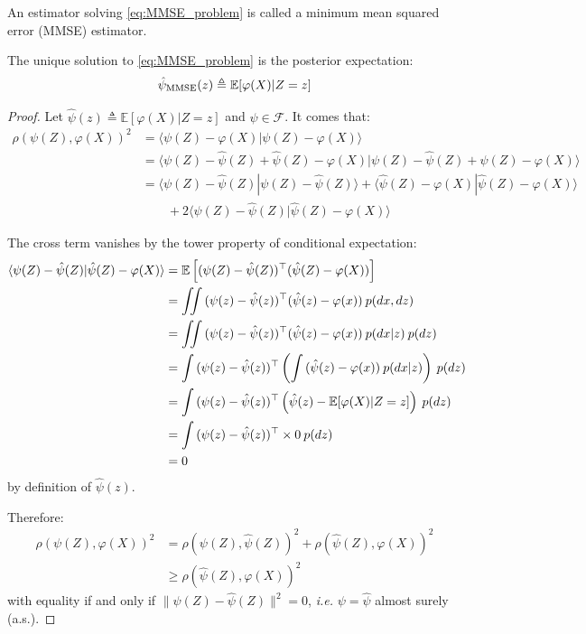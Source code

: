 An estimator solving \eqref{eq:MMSE_problem} is called a minimum mean squared error (MMSE) estimator.

\begin{proposition}\label{th:MMSE_estimator}
	The unique solution to \eqref{eq:MMSE_problem} is the posterior expectation:
	\begin{equation}
		\hat{\psi}_{\textup{MMSE}}(z)\triangleq\mathbb{E}[\varphi(X)|Z=z]
	\end{equation}
\end{proposition}

\begin{proof}
	Let $\hat{\psi}(z)\triangleq\mathbb{E}[\varphi(X)|Z=z]$ and $\psi\in\mathcal{F}$. It comes that:
	\begin{equation}
		\begin{aligned}
		\rho(\psi(Z),\varphi(X))^2&=\langle\psi(Z)-\varphi(X)|\psi(Z)-\varphi(X)\rangle\\
		&=\langle\psi(Z)-\hat{\psi}(Z)+\hat{\psi}(Z)-\varphi(X)|\psi(Z)-\hat{\psi}(Z)+\hat{\psi}(Z)-\varphi(X)\rangle\\
		&=\langle\psi(Z)-\hat{\psi}(Z)|\psi(Z)-\hat{\psi}(Z)\rangle+\langle\hat{\psi}(Z)-\varphi(X)|\hat{\psi}(Z)-\varphi(X)\rangle\\
		&\qquad+2\langle\psi(Z)-\hat{\psi}(Z)|\hat{\psi}(Z)-\varphi(X)\rangle
		\end{aligned}
	\end{equation}

	The cross term vanishes by the tower property of conditional expectation:
	\begin{equation}
		\begin{aligned}
		\langle\psi(Z)-\hat{\psi}(Z)|\hat{\psi}(Z)-\varphi(X)\rangle&=\mathbb{E}\left[(\psi(Z)-\hat{\psi}(Z))^\top(\hat{\psi}(Z)-\varphi(X))\right]\\
		&=\iint{(\psi(z)-\hat{\psi}(z))^\top(\hat{\psi}(z)-\varphi(x))\:p(dx,dz)}\\
		&=\iint{(\psi(z)-\hat{\psi}(z))^\top(\hat{\psi}(z)-\varphi(x))\:p(dx|z)\:p(dz)}\\
		&=\int{(\psi(z)-\hat\psi(z))^\top\left(\int{(\hat\psi(z)-\varphi(x))\:p(dx|z)}\right)\:p(dz)}\hspace{-4pt}\\
		&=\int{(\psi(z)-\hat\psi(z))^\top\left(\hat\psi(z)-\mathbb{E}[\varphi(X)|Z=z]\right)\:p(dz)}\\
		&=\int{(\psi(z)-\hat\psi(z))^\top\times0\:p(dz)}\\
		&=0
		\end{aligned}
	\end{equation}
	by definition of $\hat\psi(z)$.

	Therefore:
	\begin{equation}
		\begin{aligned}
		\rho(\psi(Z),\varphi(X))^2&=\rho(\psi(Z),\hat{\psi}(Z))^2+\rho(\hat{\psi}(Z),\varphi(X))^2\\
		&\geq\rho(\hat{\psi}(Z),\varphi(X))^2
		\end{aligned}
	\end{equation}
	with equality if and only if $\|\psi(Z)-\hat{\psi}(Z)\|^2=0$, \textit{i.e.} $\psi=\hat{\psi}$ almost surely (a.s.).
\end{proof}


